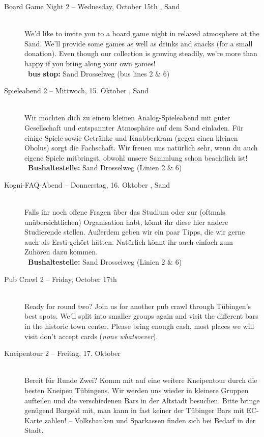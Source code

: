 \begin{description}
\ifml
	\item[Board Game Night 2 -- Wednesday, October 15th \YEAR, Sand]~\\%
	We'd like to invite you to a board game night in relaxed atmosphere at the Sand.
	We'll provide some games as well as drinks and snacks (for a small donation).
	Even though our collection is growing steadily, we're more than happy if you bring along your own games!\\
	~\textbf{bus stop:} Sand Drosselweg (bus lines 2 \& 6)
\else
	\item[Spieleabend 2 -- Mittwoch, 15. Oktober \YEAR, Sand]~\\%
	Wir möchten dich zu einem kleinen Analog-Spieleabend mit guter Gesellschaft und entspannter Atmosphäre auf dem Sand einladen.
	Für einige Spiele sowie Getränke und Knabberkram (gegen einen kleinen Obolus) sorgt die Fachschaft.
	Wir freuen uns natürlich sehr, wenn du auch eigene Spiele mitbringst, obwohl unsere Sammlung schon beachtlich ist!\\
	~\textbf{Bushaltestelle:} Sand Drosselweg (Linien 2 \& 6)
\fi

\ifkogwiss
	\item[Kogni-FAQ-Abend -- Donnerstag, 16. Oktober \YEAR, Sand]~\\%
	Falls ihr noch offene Fragen über das Studium oder zur (oftmals unübersichtlichen) Organisation habt, 
    könnt ihr diese hier andere Studierende stellen. Außerdem geben wir ein paar Tipps, die wir gerne auch als Ersti gehört hätten.
    Natürlich könnt ihr auch einfach zum Zuhören dazu kommen.\\
	~\textbf{Bushaltestelle:} Sand Drosselweg (Linien 2 \& 6)
\fi

\ifmaster \ifkogwiss \pagebreak \fi \fi

\ifml
	\item[Pub Crawl 2 -- Friday, October 17th \YEAR]~\\
	Ready for round two? Join us for another pub crawl through Tübingen's best spots.
	We'll split into smaller groups again and visit the different bars in the historic town center.
	Please bring enough cash, most places we will visit don't accept cards (\emph{none whatsoever}).
\else
	\item[Kneipentour 2 -- Freitag, 17. Oktober \YEAR]~\\
	Bereit für Runde Zwei? Komm mit auf eine weitere Kneipentour durch die besten Kneipen Tübingens.
	Wir werden uns wieder in kleinere Gruppen aufteilen und die verschiedenen Bars in der Altstadt besuchen.
	Bitte bringe genügend Bargeld mit, man kann in fast keiner der Tübinger Bars mit EC-Karte zahlen! -- Volksbanken und Sparkassen 	finden sich bei Bedarf in der Stadt.
\fi


\end{description}
